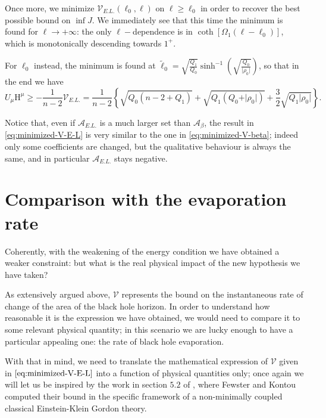 Once more, we minimize \(\mathcal{V}_{E.L.}(\ell_0, \ell)\) on \(\ell \ge \ell_0\) in order to recover the best possible bound on \(\inf J\). We immediately see that this time the minimum is found for \(\ell \rightarrow +\infty\): the only \(\ell-\)dependence is in \(\coth\left[\Omega_1(\ell- \ell_0)\right]\), which is monotonically descending towards \(1^+\).

For \(\ell_0\) instead, the minimum is found at \(\tilde{\ell}_0 = \sqrt{\frac{Q_1}{Q_0}}\sinh^{-1}\left(\sqrt{\frac{Q_0}{\vert\rho_0\vert}}\right)\), so that in the end we have
{\small
\begin{equation}
	\label{eq:minimized-V-E-L}
	U_{\mu}\mathrm{H}^{\mu} \ge - \frac{1}{n - 2}\mathcal{V}_{E.L.} =  \frac{1}{n - 2} \left\{ \sqrt{Q_0(n - 2 + Q_1)} + \sqrt{Q_1(Q_0 + \vert\rho_0\vert)} + \frac{3}{2}\sqrt{Q_1\vert\rho_0\vert} \right\}.
\end{equation}}

Notice that, even if \(\mathcal{A}_{E.L.}\) is a much larger set than \(\mathcal{A}_{\beta}\), the result in \eqref{eq:minimized-V-E-L} is very similar to the one in \eqref{eq:minimized-V-beta}; indeed only some coefficients are changed, but the qualitative behaviour is always the same, and in particular \(\mathcal{A}_{E.L.}\) stays negative.

\section{Comparison with the evaporation rate}
\label{sec:physical-interpretation-V}

Coherently, with the weakening of the energy condition we have obtained a weaker constraint: but what is the real physical impact of the new hypothesis we have taken?

As extensively argued above, \(\mathcal{V}\) represents the bound on the instantaneous rate of change of the area of the black hole horizon. In order to understand how reasonable it is the expression we have obtained, we would need to compare it to some relevant physical quantity; in this scenario we are lucky enough to have a particular appealing one: the rate of black hole evaporation.

With that in mind, we need to translate the mathematical expression of \(\mathcal{V}\) given in \(\eqref{eq:minimized-V-E-L}\) into a function of physical quantities only; once again we will let us be inspired by the work in section \(5.2\) of \cite{fewster2020new}, where Fewster and Kontou computed their bound in the specific framework of a non-minimally coupled classical Einstein-Klein Gordon theory.

